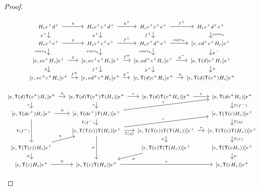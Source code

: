 \documentclass[11pt, oneside, article]{memoir}
\theoremstyle{definition}
\theoremstyle{plain}
\newcommand{\fun}[1]{\mathrm{#1}}%
\newcommand{\Fun}[1]{\mathsf{#1}}%
\newcommand{\coev}{\fun{coev}}
\newcommand{\inpt}[1]{#1^{-}}
\newcommand{\outp}[1]{#1^{+}}
\begin{document}
\begin{proof}
\begin{landscape}
\noindent\begin{minipage}{0.48\linewidth}
\[
\begin{tikzcd}[column sep=1em, row sep=0.9em, every label/.append style={font=\tiny}, font=\scriptsize, ampersand replacement=\&]
H_c\outp c\outp d
  \ar[r, "{\delta}"]
  \ar[d, "{\outp g}"']
\& H_c\outp c\outp c\outp d \ar[r, "{\outp g}"] \ar[d, "{\outp g}"']
\& H_c\outp c\outp c\outp e \ar[r, "{\outp f}"] \ar[d, "{\outp f}"']
\& H_c\outp c\outp d\outp e \ar[d, "{\coev_e}"] \\
H_c\outp c\outp e \ar[r, "{\delta}"] \ar[d, "{\coev_e}"']
\& H_c\outp c\outp c\outp e \ar[r, "{\outp f}"] \ar[d, "{\coev_e}"']
\& H_c\outp c\outp d\outp e \ar[r, "{\coev_e}"] \ar[d, "{\coev_e}"']
\& {[e,e\outp d\outp c H_c]}\outp e \ar[d, "{\inpt g}"] \\
{[e,e\outp c H_c]}\outp e \ar[r, "{\delta}"] \ar[d, "{\delta}"']
\& {[e,e\outp c\outp c H_c]}\outp e \ar[r, "{\outp f}"] \ar[d, "{\outp f}"']
\& {[e,e\outp d\outp c H_c]}\outp e \ar[r, "{\inpt g}"] \ar[d, "{\inpt g}"']
\& {[e,\Fun T(d)\outp c H_c]}\outp e \ar[d, "{\eta}"] \\
{[e,e\outp c\outp c H_c]}\outp e \ar[r, "{\outp f}"]
\& {[e,e\outp d\outp c H_c]}\outp e \ar[r, "{\inpt g}"]
\& {[e,\Fun T(d)\outp c H_c]}\outp e \ar[r, "{\eta}"]
\& {[e,\Fun T(d)\Fun T(\outp c)H_c]}\outp e
\end{tikzcd}
\]
\end{minipage}\hfill
\begin{minipage}{0.5\linewidth}
\[
\begin{tikzcd}[column sep=1em, row sep=0.9em, every label/.append style={font=\tiny}, font=\scriptsize, ampersand replacement=\&]
{[e,\Fun T(d)\Fun T(\outp c)H_c]}\outp e
  \ar[r, "{\eta}"]
  \ar[d, "{\tau}"']
\& {[e,\Fun T(d)\Fun T(\outp c)\Fun T(H_c)]}\outp e \ar[r, "{\tau}"] \ar[d, "{\tau}"']
\& {[e,\Fun T(d)\Fun T(\outp c H_c)]}\outp e \ar[r, "{\tau}"]
\& {[e,\Fun T(d\outp c H_c)]}\outp e \ar[d, "{\Fun T(\inpt f)}"] \\
{[e,\Fun T(d\outp c)H_c]}\outp e \ar[r, "{\eta}"] \ar[dd, "{\Fun T(\inpt f)}"']
\& {[e,\Fun T(d\outp c)\Fun T(H_c)]}\outp e \ar[urr, "{\tau}"] \ar[d, "{\Fun T(\inpt f)}"']
\&\& {[e,\Fun T(\Fun T(c)H_c)]}\outp e \ar[d, "{\Fun T(\eta)}"] \\
\& {[e,\Fun T(\Fun T(c))\Fun T(H_c)]}\outp e \ar[urr, "{\tau}"] \ar[dd, "{\mu}"'] \ar[r, "{\Fun T(\eta)}"']
\& {[e,\Fun T(\Fun T(c))\Fun T(\Fun T(H_c))]}\outp e \ar[r, "{\tau}"] \ar[d, "{\mu}"']
\& {[e,\Fun T(\Fun T(c)\Fun T(H_c))]}\outp e \ar[d, "{\Fun T(\tau)}"] \\
{[e,\Fun T(\Fun T(c))H_c]}\outp e \ar[ur, "{\eta}"] \ar[d, "{\mu}"']
\&\& {[e,\Fun T(c)\Fun T(\Fun T(H_c))]}\outp e \ar[dl, "{\mu}"]
\& {[e,\Fun T(\Fun T(cH_c))]}\outp e \ar[d, "{\mu}"] \\
{[e,\Fun T(c)H_c]}\outp e \ar[r, "{\eta}"]
\& {[e,\Fun T(c)\Fun T(H_c)]}\outp e \ar[rr, "{\tau}"]
\&\& {[e,\Fun T(cH_c)]}\outp e
\end{tikzcd}
\qedhere\]
\end{minipage}
\end{landscape}
\end{proof}
\end{document}
